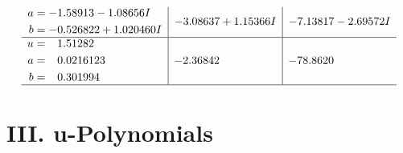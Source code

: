 \documentclass[1p]{elsarticle_modified}
\theoremstyle{definition}
\begin{document}
$$\begin{array}{c|c|c}
\begin{aligned}
a &= -1.58913 - 1.08656 I \\
b &= -0.526822 + 1.020460 I\end{aligned}
 & -3.08637 + 1.15366 I & -7.13817 - 2.69572 I \\ \hline\begin{aligned}
u &= \phantom{-}1.51282\phantom{ +0.000000I} \\
a &= \phantom{-}0.0216123\phantom{ +0.000000I} \\
b &= \phantom{-}0.301994\phantom{ +0.000000I}\end{aligned}
 & -2.36842\phantom{ +0.000000I} & -78.8620\phantom{ +0.000000I}\\
 \hline 
 \end{array}$$\newpage
\newpage\renewcommand{\arraystretch}{1}
\centering \section*{ III. u-Polynomials}
\end{document}
